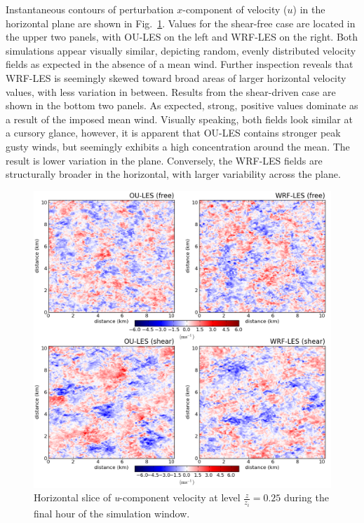 Instantaneous contours of perturbation $x$-component of velocity ($u$) in the horizontal plane are shown in Fig.~\ref{figure502}. Values for the shear-free case are located in the upper two panels, with OU-LES on the left and WRF-LES on the right. Both simulations appear visually similar, depicting random, evenly distributed velocity fields as expected in the absence of a mean wind. Further inspection reveals that WRF-LES is seemingly skewed toward broad areas of larger horizontal velocity values, with less variation in between. Results from the shear-driven case are shown in the bottom two panels. As expected, strong, positive values dominate as a result of the imposed mean wind. Visually speaking, both fields look similar at a cursory glance, however, it is apparent that OU-LES contains stronger peak gusty winds, but seemingly exhibits a high concentration around the mean. The result is lower variation in the plane. Conversely, the WRF-LES fields are structurally broader in the horizontal, with larger variability across the plane.


\begin{figure}[!ht]
\begin{center}
\includegraphics[width=\textwidth]{figures/chapter5/u_slice}
\end{center}
\caption{Horizontal slice of \textit{u}-component velocity at level $\frac{z}{z_i} = 0.25$ during the final hour of the simulation window.}
\label{figure502}
\end{figure}


